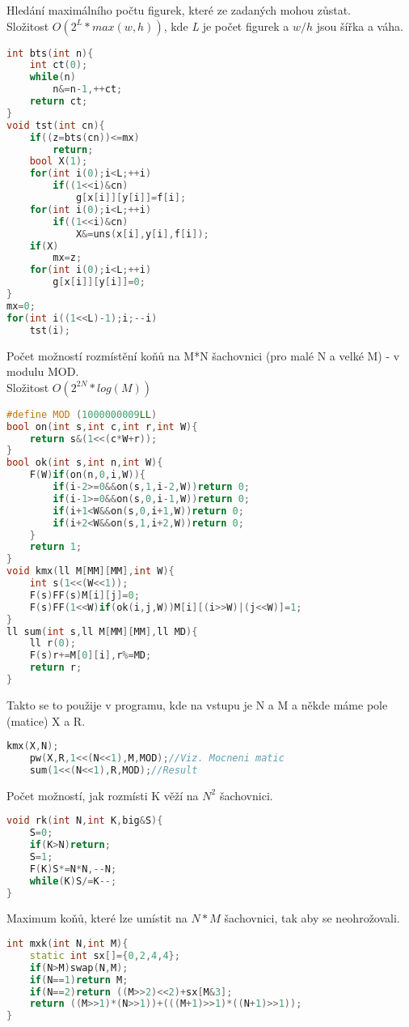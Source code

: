 \documentclass[11pt]{article}
\begin{document}
Hledání maximálního počtu figurek, které ze zadaných mohou zůstat.
\\Složitost $O(2^L*max(w,h))$, kde \textsl{L} je počet figurek a $w/h$ jsou šířka a váha.
\begin{lstlisting}[language=C++]
int bts(int n){
    int ct(0);
    while(n)
        n&=n-1,++ct;
    return ct;
}
void tst(int cn){
    if((z=bts(cn))<=mx)
        return;
    bool X(1);
    for(int i(0);i<L;++i)
        if((1<<i)&cn)
            g[x[i]][y[i]]=f[i];
    for(int i(0);i<L;++i)
        if((1<<i)&cn)
            X&=uns(x[i],y[i],f[i]);
    if(X)
        mx=z;
    for(int i(0);i<L;++i)
        g[x[i]][y[i]]=0;
}
mx=0;
for(int i((1<<L)-1);i;--i)
    tst(i);
\end{lstlisting}
Počet možností rozmístění koňů na \textsf{M}*\textsf{N} šachovnici (pro malé \textsf{N} a velké \textsf{M}) - v modulu \textsf{MOD}.
\\Složitost $O(2^{2N}*log(M))$
\begin{lstlisting}[language=C++]
#define MOD (1000000009LL)
bool on(int s,int c,int r,int W){
    return s&(1<<(c*W+r));
}
bool ok(int s,int n,int W){
    F(W)if(on(n,0,i,W)){
        if(i-2>=0&&on(s,1,i-2,W))return 0;
        if(i-1>=0&&on(s,0,i-1,W))return 0;
        if(i+1<W&&on(s,0,i+1,W))return 0;
        if(i+2<W&&on(s,1,i+2,W))return 0;
    }
    return 1;
}
void kmx(ll M[MM][MM],int W){
    int s(1<<(W<<1));
    F(s)FF(s)M[i][j]=0;
    F(s)FF(1<<W)if(ok(i,j,W))M[i][(i>>W)|(j<<W)]=1;
}
ll sum(int s,ll M[MM][MM],ll MD){
    ll r(0);
    F(s)r+=M[0][i],r%=MD;
    return r;
}
\end{lstlisting}
Takto se to použije v programu, kde na vstupu je \textsf{N} a \textsf{M} a někde máme pole (matice) \textsf{X} a \textsf{R}.
\begin{lstlisting}[language=C++]
    kmx(X,N);
    pw(X,R,1<<(N<<1),M,MOD);//Viz. Mocneni matic
    sum(1<<(N<<1),R,MOD);//Result
\end{lstlisting}
Počet možností, jak rozmísti \textsf{K} věží na \textsf{$N^2$} šachovnici.
\begin{lstlisting}[language=C++]
void rk(int N,int K,big&S){
    S=0;
    if(K>N)return;
    S=1;
    F(K)S*=N*N,--N;
    while(K)S/=K--;
}
\end{lstlisting}
Maximum koňů, které lze umístit na $N*M$ šachovnici, tak aby se neohrožovali.
\begin{lstlisting}[language=C++]
int mxk(int N,int M){
    static int sx[]={0,2,4,4};
    if(N>M)swap(N,M);
    if(N==1)return M;
    if(N==2)return ((M>>2)<<2)+sx[M&3];
    return ((M>>1)*(N>>1))+(((M+1)>>1)*((N+1)>>1));
}
\end{lstlisting}
\end{document}

